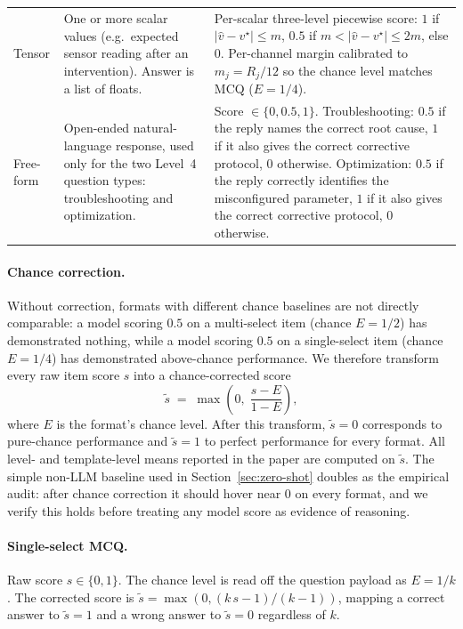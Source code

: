 \documentclass{article}
\begin{document}
\begin{table}[htbp]
\begin{tabular}{@{}l p{4.6cm} p{6.2cm}@{}}
        \addlinespace
        Tensor            & One or more scalar values (e.g.\ expected sensor reading after an intervention). Answer is a list of floats.                         & Per-scalar three-level piecewise score: $1$ if $|\hat{v}-v^{\star}|\!\leq\! m$, $0.5$ if $m\!<\!|\hat{v}-v^{\star}|\!\leq\!2m$, else $0$. Per-channel margin calibrated to $m_j = R_j/12$ so the chance level matches MCQ ($E = 1/4$).                                                                                   \\
        \addlinespace
        Free-form         & Open-ended natural-language response, used only for the two Level~4 question types: troubleshooting and optimization.                & Score $\in\{0, 0.5, 1\}$. Troubleshooting: $0.5$ if the reply names the correct root cause, $1$ if it also gives the correct corrective protocol, $0$ otherwise. Optimization: $0.5$ if the reply correctly identifies the misconfigured parameter, $1$ if it also gives the correct corrective protocol, $0$ otherwise. \\
        \bottomrule
    \end{tabular}
\end{table}

\paragraph{Chance correction.} Without correction, formats with different chance baselines are not directly comparable: a model scoring $0.5$ on a multi-select item (chance $E=1/2$) has demonstrated nothing, while a model scoring $0.5$ on a single-select item (chance $E=1/4$) has demonstrated above-chance performance. We therefore transform every raw item score $s$ into a chance-corrected score
\begin{equation*}
    \tilde{s} \;=\; \max\!\left(0,\; \frac{s - E}{1 - E}\right),
\end{equation*}
where $E$ is the format's chance level. After this transform, $\tilde{s}=0$ corresponds to pure-chance performance and $\tilde{s}=1$ to perfect performance for every format. All level- and template-level means reported in the paper are computed on $\tilde{s}$. The simple non-LLM baseline used in Section~\ref{sec:zero-shot} doubles as the empirical audit: after chance correction it should hover near $0$ on every format, and we verify this holds before treating any model score as evidence of reasoning.

\paragraph{Single-select MCQ.} Raw score $s\in\{0,1\}$. The chance level is read off the question payload as $E=1/k$. The corrected score is $\tilde{s} = \max(0, (k\,s - 1)/(k - 1))$, mapping a correct answer to $\tilde{s}=1$ and a wrong answer to $\tilde{s}=0$ regardless of $k$.
\end{document}

